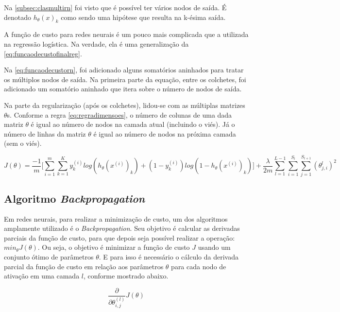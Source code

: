 Na \autoref{subsec:clasmultirn} foi visto que é possível ter vários nodos de saída. É denotado $h_{\theta}(x)_k$ como sendo uma hipótese que resulta na k-ésima saída.

A função de custo para redes neurais é um pouco mais complicada que a utilizada na regressão logística. Na verdade, ela é uma generalização da \autoref{eq:funcaodecustofinalreg}. 

Na \autoref{eq:funcaodecustorn}, foi adicionado alguns somatórios aninhados para tratar os múltiplos nodos de saída. Na primeira parte da equação, entre os colchetes, foi adicionado um somatório aninhado que itera sobre o número de nodos de saída.

Na parte da regularização (após os colchetes), lidou-se com as múltiplas matrizes $\theta$s. Conforme a regra \ref{eq:regradimensoes}, o número de colunas de uma dada matriz $\theta$ é igual ao número de nodos na camada atual (incluindo o viés). Já o número de linhas da matriz $\theta$ é igual ao número de nodos na próxima camada (sem o viés). 

\begin{equation}\label{eq:funcaodecustorn}
J(\theta) = \frac{-1}{m}\Big[ \sum\limits_{i=1}^m \sum\limits_{k=1}^K y_k^{(i)}log(h_{\theta}(x^{(i)})_k) + (1 - y_k^{(i)})log(1 - h_{\theta}(x^{(i)})_k) \Big] +
\frac{\lambda}{2m} 
\sum\limits_{l=1}^{L-1}
\sum\limits_{i=1}^{S_l}
\sum\limits_{j=1}^{S_{l+1}} (\theta_{j,i}^{l})^2
\end{equation}


\subsection{Algoritmo \textit{Backpropagation}}

Em redes neurais, para realizar a minimização de custo, um dos algoritmos amplamente utilizado é o \textit{Backpropagation}. Seu objetivo é calcular as derivadas parciais da função de custo, para que depois seja possível realizar a operação: $min_{\theta}J(\theta)$. Ou seja, o objetivo é minimizar a função de custo $J$ usando um conjunto ótimo de parâmetros $\theta$. E para isso é necessário o cálculo da derivada parcial da função de custo em relação aos parâmetros $\theta$ para cada nodo de ativação em uma camada $l$, conforme mostrado abaixo.

\begin{equation}
\frac{\partial}{\partial\theta_{i,j}^{(l)}} J(\theta) \nonumber
\end{equation}


